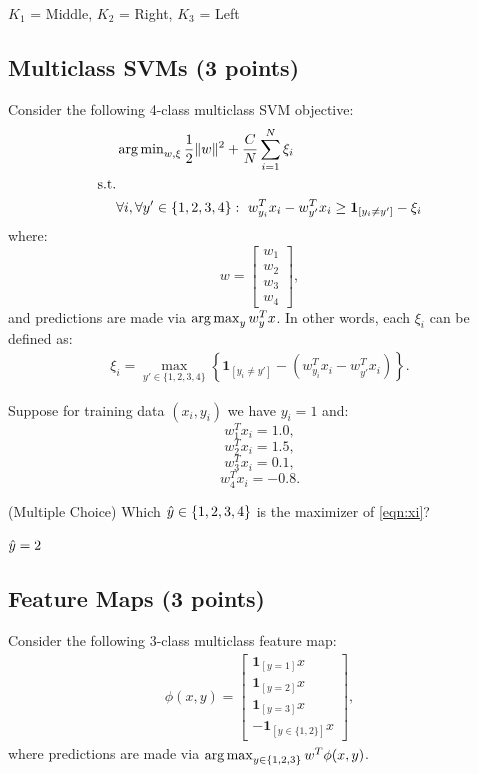 \vspace{-0.2in}
\begin{solution}
$K_1$ = Middle, $K_2$ = Right, $K_3$ = Left
\end{solution}


\smallskip





\subsection{Multiclass SVMs (3 points)}
\label{sec:multiclass_svm}


Consider the following 4-class multiclass SVM objective:
\begin{align*}
&\operatorname{arg\,min}_{w,\xi} \frac{1}{2}\|w\|^2 + \frac{C}{N}\sum_{i=1}^N \xi_i\\
\mbox{s.t.}\\
   & \forall i, \forall y' \in \{1,2,3,4\}:\ w_{y_i}^T x_i - w_{y'}^Tx_i \geq \textbf{1}_{[y_i\neq y']} - \xi_i
\end{align*}
where:
$$ w = \left[\begin{array}{c}
w_1\\
w_2\\
w_3\\
w_4
\end{array}\right],$$
and predictions are made via $\operatorname{arg\,max}_{y} w_y^Tx$.  In other words, each $\xi_i$ can be defined as:
\begin{eqnarray}
\xi_i = \max_{y' \in \{1,2,3,4\}} \left\{\textbf{1}_{[y_i\neq y']} - \left(w_{y_i}^T x_i - w_{y'}^Tx_i\right)\right\}\label{eqn:xi}.
\end{eqnarray}

Suppose for training data $(x_i,y_i)$ we have $y_i = 1$ and:
$$w_1^Tx_i  = 1.0,$$
$$w_2^Tx_i  = 1.5,$$
$$w_3^Tx_i  = 0.1,$$
$$w_4^Tx_i  = -0.8.$$

\smallskip

\question (Multiple Choice) Which $\hat{y}\in\{1,2,3,4\}$  is the maximizer of \eqref{eqn:xi}?


\begin{solution}
$\hat{y} = 2$
\end{solution}

\smallskip

\subsection{Feature Maps (3 points)}

Consider the following 3-class multiclass feature map:
\begin{eqnarray}
\phi(x,y) = \left[\begin{array}{c}
\textbf{1}_{[y=1]} x\\
\textbf{1}_{[y=2]} x\\
\textbf{1}_{[y=3]} x\\
-\textbf{1}_{[y\in\{1,2\}]} x
\end{array}\right],
   \label{eqn:feature}
   \end{eqnarray}
where predictions are made via $\operatorname{arg\,max}_{y\in\{1,2,3\}} w^T\phi(x,y)$.

